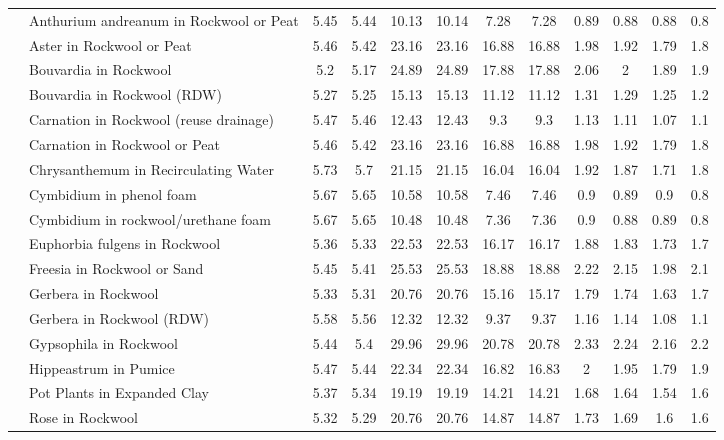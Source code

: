 \documentclass[
  letterpaper,
  DIV=11,
  numbers=noendperiod]{scrreprt}
\begin{document}
\begin{landscape}
\begin{longtable}[t]{llcccccccccc}
 & Anthurium andreanum in Rockwool or Peat & 5.45 & 5.44 & 10.13 & 10.14 & 7.28 & 7.28 & 0.89 & 0.88 & 0.88 & 0.8\\
\nopagebreak
 & Aster in Rockwool or Peat & 5.46 & 5.42 & 23.16 & 23.16 & 16.88 & 16.88 & 1.98 & 1.92 & 1.79 & 1.8\\
\nopagebreak
 & Bouvardia in Rockwool & 5.2 & 5.17 & 24.89 & 24.89 & 17.88 & 17.88 & 2.06 & 2 & 1.89 & 1.9\\
\nopagebreak
 & Bouvardia in Rockwool (RDW) & 5.27 & 5.25 & 15.13 & 15.13 & 11.12 & 11.12 & 1.31 & 1.29 & 1.25 & 1.2\\
\nopagebreak
 & Carnation in Rockwool (reuse drainage) & 5.47 & 5.46 & 12.43 & 12.43 & 9.3 & 9.3 & 1.13 & 1.11 & 1.07 & 1.1\\
\nopagebreak
 & Carnation in Rockwool or Peat & 5.46 & 5.42 & 23.16 & 23.16 & 16.88 & 16.88 & 1.98 & 1.92 & 1.79 & 1.8\\
\nopagebreak
 & Chrysanthemum in Recirculating Water & 5.73 & 5.7 & 21.15 & 21.15 & 16.04 & 16.04 & 1.92 & 1.87 & 1.71 & 1.8\\
\nopagebreak
 & Cymbidium in phenol foam & 5.67 & 5.65 & 10.58 & 10.58 & 7.46 & 7.46 & 0.9 & 0.89 & 0.9 & 0.8\\
\nopagebreak
 & Cymbidium in rockwool/urethane foam & 5.67 & 5.65 & 10.48 & 10.48 & 7.36 & 7.36 & 0.9 & 0.88 & 0.89 & 0.8\\
\nopagebreak
 & Euphorbia fulgens in Rockwool & 5.36 & 5.33 & 22.53 & 22.53 & 16.17 & 16.17 & 1.88 & 1.83 & 1.73 & 1.7\\
\nopagebreak
 & Freesia in Rockwool or Sand & 5.45 & 5.41 & 25.53 & 25.53 & 18.88 & 18.88 & 2.22 & 2.15 & 1.98 & 2.1\\
\nopagebreak
 & Gerbera in Rockwool & 5.33 & 5.31 & 20.76 & 20.76 & 15.16 & 15.17 & 1.79 & 1.74 & 1.63 & 1.7\\
\nopagebreak
 & Gerbera in Rockwool (RDW) & 5.58 & 5.56 & 12.32 & 12.32 & 9.37 & 9.37 & 1.16 & 1.14 & 1.08 & 1.1\\
\nopagebreak
 & Gypsophila in Rockwool & 5.44 & 5.4 & 29.96 & 29.96 & 20.78 & 20.78 & 2.33 & 2.24 & 2.16 & 2.2\\
\nopagebreak
 & Hippeastrum in Pumice & 5.47 & 5.44 & 22.34 & 22.34 & 16.82 & 16.83 & 2 & 1.95 & 1.79 & 1.9\\
\nopagebreak
 & Pot Plants in Expanded Clay & 5.37 & 5.34 & 19.19 & 19.19 & 14.21 & 14.21 & 1.68 & 1.64 & 1.54 & 1.6\\
\nopagebreak
 & Rose in Rockwool & 5.32 & 5.29 & 20.76 & 20.76 & 14.87 & 14.87 & 1.73 & 1.69 & 1.6 & 1.6\\

\end{longtable}
\end{landscape}
\end{document}
